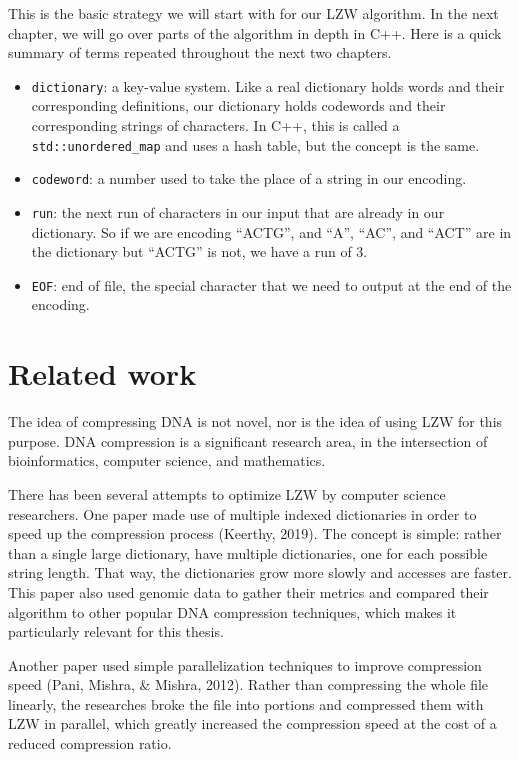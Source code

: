\documentclass[12pt,twoside]{reedthesis}
\providecommand{\tightlist}{%
  \setlength{\itemsep}{0pt}\setlength{\parskip}{0pt}}
\begin{document}
This is the basic strategy we will start with for our LZW algorithm. In the next chapter, we will go over parts of the algorithm in depth in C++. Here is a quick summary of terms repeated throughout the next two chapters.
\begin{itemize}
\tightlist
\item
  \texttt{dictionary}: a key-value system. Like a real dictionary holds words and their corresponding definitions, our dictionary holds codewords and their corresponding strings of characters. In C++, this is called a \texttt{std::unordered\_map} and uses a hash table, but the concept is the same.
\item
  \texttt{codeword}: a number used to take the place of a string in our encoding.
\item
  \texttt{run}: the next run of characters in our input that are already in our dictionary. So if we are encoding ``ACTG'', and ``A'', ``AC'', and ``ACT'' are in the dictionary but ``ACTG'' is not, we have a run of 3.
\item
  \texttt{EOF}: end of file, the special character that we need to output at the end of the encoding.
\end{itemize}
\hypertarget{related-work}{%
\section{Related work}\label{related-work}}

The idea of compressing DNA is not novel, nor is the idea of using LZW for this purpose. DNA compression is a significant research area, in the intersection of bioinformatics, computer science, and mathematics.

There has been several attempts to optimize LZW by computer science researchers. One paper made use of multiple indexed dictionaries in order to speed up the compression process (Keerthy, 2019). The concept is simple: rather than a single large dictionary, have multiple dictionaries, one for each possible string length. That way, the dictionaries grow more slowly and accesses are faster. This paper also used genomic data to gather their metrics and compared their algorithm to other popular DNA compression techniques, which makes it particularly relevant for this thesis.

Another paper used simple parallelization techniques to improve compression speed (Pani, Mishra, \& Mishra, 2012). Rather than compressing the whole file linearly, the researches broke the file into portions and compressed them with LZW in parallel, which greatly increased the compression speed at the cost of a reduced compression ratio.
\end{document}
